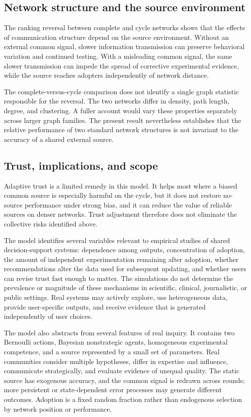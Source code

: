 \documentclass[10pt,letterpaper,twocolumn]{article}
\begin{document}
\subsection{Network structure and the source environment}

The ranking reversal between complete and cycle networks shows that the effects of communication structure depend on the source environment. Without an external common signal, slower information transmission can preserve behavioral variation and continued testing. With a misleading common signal, the same slower transmission can impede the spread of corrective experimental evidence, while the source reaches adopters independently of network distance.

The complete-versus-cycle comparison does not identify a single graph statistic responsible for the reversal. The two networks differ in density, path length, degree, and clustering. A fuller account would vary these properties separately across larger graph families. The present result nevertheless establishes that the relative performance of two standard network structures is not invariant to the accuracy of a shared external source.

\subsection{Trust, implications, and scope}

Adaptive trust is a limited remedy in this model. It helps most where a biased common source is especially harmful on the cycle, but it does not restore no-source performance under strong bias, and it can reduce the value of reliable sources on denser networks. Trust adjustment therefore does not eliminate the collective risks identified above.

The model identifies several variables relevant to empirical studies of shared decision-support systems: dependence among outputs, concentration of adoption, the amount of independent experimentation remaining after adoption, whether recommendations alter the data used for subsequent updating, and whether users can revise trust fast enough to matter. The simulations do not determine the prevalence or magnitude of these mechanisms in scientific, clinical, journalistic, or public settings. Real systems may actively explore, use heterogeneous data, provide user-specific outputs, and receive evidence that is generated independently of user choices.

The model also abstracts from several features of real inquiry. It contains two Bernoulli actions, Bayesian nonstrategic agents, homogeneous experimental competence, and a source represented by a small set of parameters. Real communities consider multiple hypotheses, differ in expertise and influence, communicate strategically, and evaluate evidence of unequal quality. The static source has exogenous accuracy, and the common signal is redrawn across rounds; more persistent or state-dependent error processes may generate different outcomes. Adoption is a fixed random fraction rather than endogenous selection by network position or performance.
\end{document}
